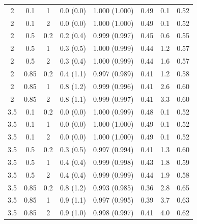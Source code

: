 \begin{table}[tp]
\begin{tabular}{@{}cccccccc@{}}
2 & 0.1 & 1 & 0.0 (0.0) & 1.000 (1.000) & 0.49 & 0.1 & 0.52 \\
2 & 0.1 & 2 & 0.0 (0.0) & 1.000 (1.000) & 0.49 & 0.1 & 0.52 \\
2 & 0.5 & 0.2 & 0.2 (0.4) & 0.999 (0.997) & 0.45 & 0.6 & 0.55 \\
2 & 0.5 & 1 & 0.3 (0.5) & 1.000 (0.999) & 0.44 & 1.2 & 0.57 \\
2 & 0.5 & 2 & 0.3 (0.4) & 1.000 (0.999) & 0.44 & 1.6 & 0.57 \\
2 & 0.85 & 0.2 & 0.4 (1.1) & 0.997 (0.989) & 0.41 & 1.2 & 0.58 \\
2 & 0.85 & 1 & 0.8 (1.2) & 0.999 (0.996) & 0.41 & 2.6 & 0.60 \\
2 & 0.85 & 2 & 0.8 (1.1) & 0.999 (0.997) & 0.41 & 3.3 & 0.60 \\
3.5 & 0.1 & 0.2 & 0.0 (0.0) & 1.000 (0.999) & 0.48 & 0.1 & 0.52 \\
3.5 & 0.1 & 1 & 0.0 (0.0) & 1.000 (1.000) & 0.49 & 0.1 & 0.52 \\
3.5 & 0.1 & 2 & 0.0 (0.0) & 1.000 (1.000) & 0.49 & 0.1 & 0.52 \\
3.5 & 0.5 & 0.2 & 0.3 (0.5) & 0.997 (0.994) & 0.41 & 1.3 & 0.60 \\
3.5 & 0.5 & 1 & 0.4 (0.4) & 0.999 (0.998) & 0.43 & 1.8 & 0.59 \\
3.5 & 0.5 & 2 & 0.4 (0.4) & 0.999 (0.999) & 0.44 & 1.9 & 0.58 \\
3.5 & 0.85 & 0.2 & 0.8 (1.2) & 0.993 (0.985) & 0.36 & 2.8 & 0.65 \\
3.5 & 0.85 & 1 & 0.9 (1.1) & 0.997 (0.995) & 0.39 & 3.7 & 0.63 \\
3.5 & 0.85 & 2 & 0.9 (1.0) & 0.998 (0.997) & 0.41 & 4.0 & 0.62 \\
\bottomrule
\end{tabular}
\end{table}
